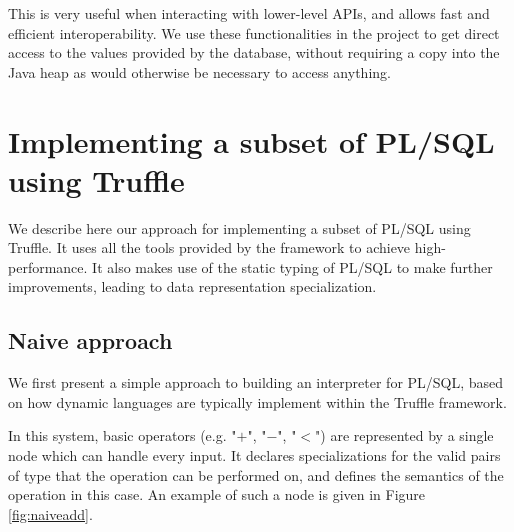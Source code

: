 \documentclass[twoside,11pt,a4paper]{article}
\newcommand{\maybe}[1]{\textit{(maybe ? #1)}}
\newcommand{\pls}[1]{\small\texttt{#1}\normalsize}
\newcommand{\plstype}[1]{\pls{#1}}
\newcommand{\plsi}{\plstype{PLS\_INTEGER}}
\newcommand{\simpleint}{\plstype{SIMPLE\_INTEGER}}
\newcommand{\startsection}[1]{
	\cleardoublepage
	\section{#1}
	\thispagestyle{basic}
}
\begin{document}
This is very useful when interacting with lower-level APIs, and allows fast and efficient interoperability. We use these functionalities in the project to get direct access to the values provided by the database, without requiring a copy into the Java heap as would otherwise be necessary to access anything.

\startsection{Implementing a subset of PL/SQL using Truffle}
\thispagestyle{plain}

We describe here our approach for implementing a subset of PL/SQL using Truffle. It uses all the tools provided by the framework to achieve high-performance. It also makes use of the static typing of PL/SQL to make further improvements, leading to data representation specialization.


\subsection{Naive approach}


We first present a simple approach to building an interpreter for PL/SQL, based on how dynamic languages are typically implement within the Truffle framework.

In this system, basic operators (e.g. "$+$", "$-$", "$<$") are represented by a single node which can handle every input. It declares specializations for the valid pairs of type that the operation can be performed on, and defines the semantics of the operation in this case. An example of such a node is given in Figure \ref{fig:naiveadd}.
\end{document}
